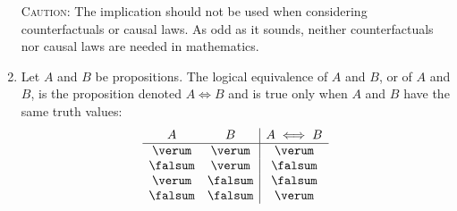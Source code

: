 \begin{node}[Connectives]
\begin{enumerate}
\textsc{Caution:} The implication should not be used when considering
counterfactuals or causal laws. As odd as it sounds, neither
counterfactuals nor causal laws are needed in mathematics.
\item Let $A$ and $B$ be propositions. The logical equivalence of $A$
  and $B$, or  of $A$ and $B$, is the proposition
  denoted $A\iff B$ and is true only when $A$ and $B$ have the same
  truth values:
\[\begin{array}{cc|c}
A & B & A\iff B\\\hline
\verum  & \verum  & \verum\\
\falsum & \verum  & \falsum\\
\verum  & \falsum & \falsum\\
\falsum & \falsum & \verum\\
\end{array}\]
\end{enumerate}
\end{node}
